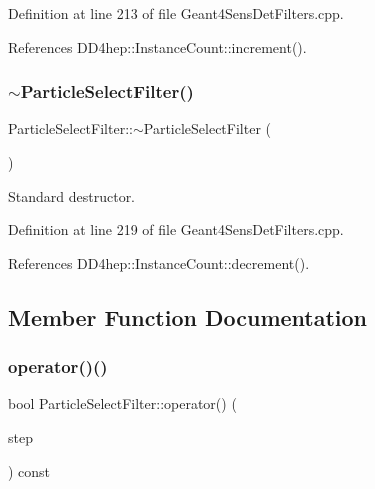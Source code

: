 Definition at line 213 of file Geant4\+Sens\+Det\+Filters.\+cpp.



References D\+D4hep\+::\+Instance\+Count\+::increment().

\hypertarget{struct_d_d4hep_1_1_simulation_1_1_particle_select_filter_aee798c7febdef997d9288130d8c08d0f}{}\label{struct_d_d4hep_1_1_simulation_1_1_particle_select_filter_aee798c7febdef997d9288130d8c08d0f} 
\subsubsection{\texorpdfstring{$\sim$\+Particle\+Select\+Filter()}{~ParticleSelectFilter()}}
{\footnotesize\ttfamily Particle\+Select\+Filter\+::$\sim$\+Particle\+Select\+Filter (\begin{DoxyParamCaption}{ }\end{DoxyParamCaption})\hspace{0.3cm}{\ttfamily [virtual]}}



Standard destructor. 



Definition at line 219 of file Geant4\+Sens\+Det\+Filters.\+cpp.



References D\+D4hep\+::\+Instance\+Count\+::decrement().



\subsection{Member Function Documentation}
\hypertarget{struct_d_d4hep_1_1_simulation_1_1_particle_select_filter_aa24ab138bc02e2e02a06c4d75db74667}{}\label{struct_d_d4hep_1_1_simulation_1_1_particle_select_filter_aa24ab138bc02e2e02a06c4d75db74667} 
\subsubsection{\texorpdfstring{operator()()}{operator()()}}
{\footnotesize\ttfamily bool Particle\+Select\+Filter\+::operator() (\begin{DoxyParamCaption}\item[{const G4\+Step $\ast$}]{step }\end{DoxyParamCaption}) const\hspace{0.3cm}{\ttfamily [virtual]}}




